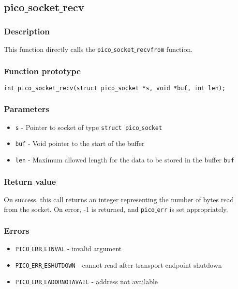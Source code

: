 \subsection{pico$\_$socket$\_$recv}

\subsubsection*{Description}
This function directly calls the \texttt{pico$\_$socket$\_$recvfrom} function.

\subsubsection*{Function prototype}
\begin{verbatim}
int pico_socket_recv(struct pico_socket *s, void *buf, int len);
\end{verbatim}

\subsubsection*{Parameters}
\begin{itemize}[noitemsep]
\item \texttt{s} - Pointer to socket of type \texttt{struct pico$\_$socket}
\item \texttt{buf} - Void pointer to the start of the buffer
\item \texttt{len} - Maximum allowed length for the data to be stored in the buffer \texttt{buf}
\end{itemize}

\subsubsection*{Return value}
On success, this call returns an integer representing the number of bytes read
from the socket. On error, -1 is returned, and \texttt{pico$\_$err} is set appropriately.

\subsubsection*{Errors}
\begin{itemize}[noitemsep]
\item \texttt{PICO$\_$ERR$\_$EINVAL} - invalid argument
\item \texttt{PICO$\_$ERR$\_$ESHUTDOWN} - cannot read after transport endpoint shutdown
\item \texttt{PICO$\_$ERR$\_$EADDRNOTAVAIL} - address not available
\end{itemize}


